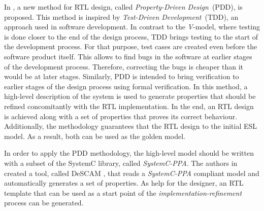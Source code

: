 
In \cite{paper-pdd}, a new method for RTL design, called \textit{Property-Driven Design}~(PDD), is proposed. This method is inspired by \textit{Test-Driven Development}~(TDD), an approach used in software development. In contrast to the \textit{V}-model, where testing is done closer to the end of the design process, TDD brings testing to the start of the development process. For that purpose, test cases are created even before the software product itself. This allows to find bugs in the software at earlier stages of the development process. Therefore, correcting the bugs is cheaper than it would be at later stages. Similarly, PDD is intended to bring verification to earlier stages of the design process using formal verification. In this method, a high-level description of the system is used to generate properties that should be refined concomitantly with the RTL implementation. In the end, an RTL design is achieved along with a set of properties that proves its correct behaviour. Additionally, the methodology guarantees that the  RTL design   to the initial ESL model. As a result, both can be used as the golden model.

In order to apply the PDD methodology, the high-level model should be written with a subset of the SystemC \cite{lib-systemc} library, called \textit{SystemC-PPA}. The authors in \cite{paper-pdd} created a tool, called DeSCAM \cite{descam}, that reads a \textit{SystemC-PPA} compliant model and automatically generates a set of properties. As help for the designer, an RTL template that can be used as a start point of the \textit{implementation-refinement} process can be generated.

